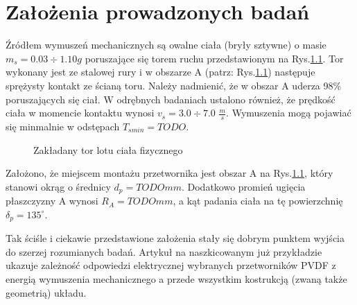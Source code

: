 \chapter{Założenia prowadzonych badań}
\label{sec:assumptions}

Źródłem wymuszeń mechanicznych są owalne ciała (bryły sztywne) o masie $m_s=0.03\div1.10 g$ poruszające się torem ruchu przedstawionym na Rys.\ref{fig:route}. Tor wykonany jest ze stalowej rury i w obszarze A (patrz: Rys.\ref{fig:route}) następuje sprężysty kontakt ze ścianą toru. Należy nadmienić, że w obszar A uderza 98\% poruszających się ciał. W odrębnych badaniach ustalono również, że prędkość ciała w momencie kontaktu wynosi $v_s=3.0\div7.0$ $\frac{m}{s}$. Wymuszenia mogą pojawiać się minmalnie w odstępach $T_{smin}=TODO$.

\begin{figure}[htbp]
\centering
{}%
\caption{Zakładany tor lotu ciała fizycznego}
\label{fig:route}
\end{figure}

Założono, że miejscem montażu przetwornika jest obszar A na Rys.\ref{fig:route}, który stanowi okrąg o średnicy $d_p=TODO mm$. Dodatkowo promień ugięcia płaszczyzny A wynosi $R_A=TODOmm$, a kąt padania ciała na tę powierzchnię $\delta_p=135^{\circ}$. 

Tak ściśle i ciekawie przedstawione założenia stały się dobrym punktem wyjścia do szerzej rozumianych badań. Artykuł na naszkicowanym już przykładzie ukazuje zależność odpowiedzi elektrycznej wybranych przetworników PVDF z energią wymuszenia mechanicznego a przede wszystkim kostrukcją (zwaną także geometrią) układu.